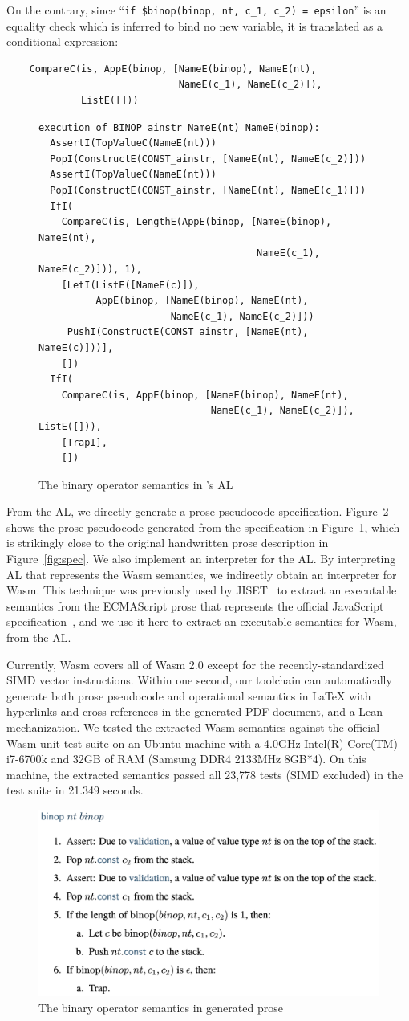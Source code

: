 \noindent
On the contrary, since ``{\small\verb!if $binop(binop, nt, c_1, c_2) = epsilon!}''
is an equality check which is inferred to bind no new variable, it is translated as a conditional expression:

\smallskip
{\small
\begin{verbatim}
    CompareC(is, AppE(binop, [NameE(binop), NameE(nt),
                              NameE(c_1), NameE(c_2)]),
             ListE([]))
\end{verbatim}
}
\smallskip

\begin{figure}[t]
\footnotesize
\begin{verbatim}
execution_of_BINOP_ainstr NameE(nt) NameE(binop):
  AssertI(TopValueC(NameE(nt)))
  PopI(ConstructE(CONST_ainstr, [NameE(nt), NameE(c_2)]))
  AssertI(TopValueC(NameE(nt)))
  PopI(ConstructE(CONST_ainstr, [NameE(nt), NameE(c_1)]))
  IfI(
    CompareC(is, LengthE(AppE(binop, [NameE(binop), NameE(nt),
                                      NameE(c_1), NameE(c_2)])), 1),
    [LetI(ListE([NameE(c)]),
          AppE(binop, [NameE(binop), NameE(nt),
                       NameE(c_1), NameE(c_2)]))
     PushI(ConstructE(CONST_ainstr, [NameE(nt), NameE(c)]))],
    [])
  IfI(
    CompareC(is, AppE(binop, [NameE(binop), NameE(nt),
                              NameE(c_1), NameE(c_2)]), ListE([])),
    [TrapI],
    [])
\end{verbatim}
\caption{The binary operator semantics in \dslname's AL}
\label{fig:al}
\end{figure}


From the AL, we directly generate a prose pseudocode specification.
Figure~\ref{fig:gen-spec} shows the prose pseudocode generated from the specification in Figure~\ref{fig:al},
which is strikingly close to the original handwritten prose description in Figure~\ref{fig:spec}.
%
We also implement an interpreter for the AL.
%
By interpreting AL that represents the Wasm semantics, we indirectly obtain an interpreter for Wasm.
%
This technique was previously used by JISET~\cite{jiset,esmeta}
to extract an executable semantics from the ECMAScript prose that represents the official
JavaScript specification~\cite{ecmascript}, and we use it here to extract an executable semantics for Wasm, from the \dslname AL.

Currently, Wasm \dslname covers all of Wasm 2.0 except for the recently-standardized SIMD vector instructions.
Within one second, our toolchain can automatically generate both prose pseudocode and operational semantics in LaTeX
with hyperlinks and cross-references in the generated PDF document, and a Lean mechanization.
We tested the extracted Wasm semantics against the official Wasm unit test suite
on an Ubuntu machine with
a 4.0GHz Intel(R) Core(TM) i7-6700k and 32GB of RAM (Samsung DDR4 2133MHz 8GB*4).
On this machine, the extracted semantics passed all 23,778 tests (SIMD excluded) in the
test suite in 21.349 seconds.

\begin{figure}[t]
\includegraphics[width=.48\textwidth]{figs/gen-spec.png}
\caption{The binary operator semantics in generated prose}
\label{fig:gen-spec}
\end{figure}

